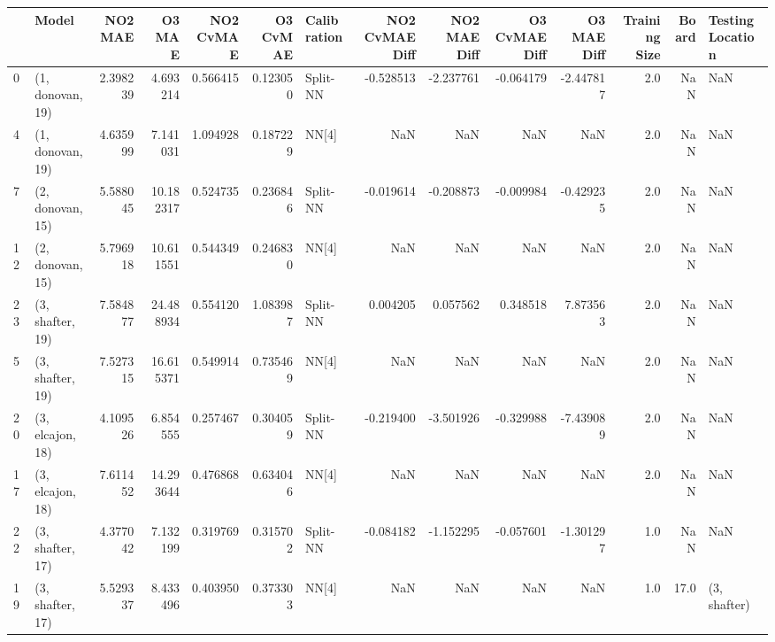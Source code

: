\begin{tabular}{llrrrrlrrrrrrl}
\toprule
{} &             Model &    NO2 MAE &     O3 MAE &  NO2 CvMAE &  O3 CvMAE & Calibration &  NO2 CvMAE Diff &  NO2 MAE Diff &  O3 CvMAE Diff &  O3 MAE Diff &  Training Size &  Board & Testing Location \\
\midrule
0  &  (1, donovan, 19) &   2.398239 &   4.693214 &   0.566415 &  0.123050 &    Split-NN &       -0.528513 &     -2.237761 &      -0.064179 &    -2.447817 &            2.0 &    NaN &              NaN \\
4  &  (1, donovan, 19) &   4.635999 &   7.141031 &   1.094928 &  0.187229 &       NN[4] &             NaN &           NaN &            NaN &          NaN &            2.0 &    NaN &              NaN \\
7  &  (2, donovan, 15) &   5.588045 &  10.182317 &   0.524735 &  0.236846 &    Split-NN &       -0.019614 &     -0.208873 &      -0.009984 &    -0.429235 &            2.0 &    NaN &              NaN \\
12 &  (2, donovan, 15) &   5.796918 &  10.611551 &   0.544349 &  0.246830 &       NN[4] &             NaN &           NaN &            NaN &          NaN &            2.0 &    NaN &              NaN \\
23 &  (3, shafter, 19) &   7.584877 &  24.488934 &   0.554120 &  1.083987 &    Split-NN &        0.004205 &      0.057562 &       0.348518 &     7.873563 &            2.0 &    NaN &              NaN \\
5  &  (3, shafter, 19) &   7.527315 &  16.615371 &   0.549914 &  0.735469 &       NN[4] &             NaN &           NaN &            NaN &          NaN &            2.0 &    NaN &              NaN \\
20 &  (3, elcajon, 18) &   4.109526 &   6.854555 &   0.257467 &  0.304059 &    Split-NN &       -0.219400 &     -3.501926 &      -0.329988 &    -7.439089 &            2.0 &    NaN &              NaN \\
17 &  (3, elcajon, 18) &   7.611452 &  14.293644 &   0.476868 &  0.634046 &       NN[4] &             NaN &           NaN &            NaN &          NaN &            2.0 &    NaN &              NaN \\
22 &  (3, shafter, 17) &   4.377042 &   7.132199 &   0.319769 &  0.315702 &    Split-NN &       -0.084182 &     -1.152295 &      -0.057601 &    -1.301297 &            1.0 &    NaN &              NaN \\
19 &  (3, shafter, 17) &   5.529337 &   8.433496 &   0.403950 &  0.373303 &       NN[4] &             NaN &           NaN &            NaN &          NaN &            1.0 &   17.0 &     (3, shafter) \\

\end{tabular}
